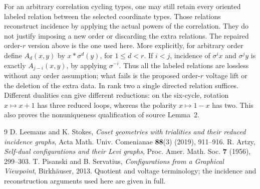 \documentclass[11pt,a4paper]{article}
\begin{document}
For an arbitrary correlation cycling types, one may still retain every
oriented labeled relation between the selected coordinate types. Those
relations reconstruct incidence by applying the actual powers of the
correlation. They do not justify imposing a new order or discarding the
extra relations. The repaired order-$r$ version above is the one used here. More explicitly,
for arbitrary order define $A_d(x,y)$ by $x*\sigma^d(y)$, for
$1\leq d<r$. If $i<j$, incidence of $\sigma^i x$ and $\sigma^j y$
is exactly $A_{j-i}(x,y)$, by applying $\sigma^{-i}$. Thus all the
labeled relations are lossless without any order assumption; what fails is
the proposed order-$r$ voltage lift or the deletion of the extra data.
In rank two a single directed relation suffices. Different dualities can
give different reductions: on the six-cycle, rotation $x\mapsto x+1$
has three reduced loops, whereas the polarity $x\mapsto1-x$ has two.
This also proves the nonuniqueness qualification of source Lemma~2.

\begin{thebibliography}{9}
 D. Leemans and K. Stokes, \emph{Coset geometries with trialities
and their reduced incidence graphs}, Acta Math. Univ. Comenianae
\textbf{88}(3) (2019), 911--916.
 R. Artzy, \emph{Self-dual configurations and their Levi graphs},
Proc. Amer. Math. Soc. \textbf{7} (1956), 299--303.
 T. Pisanski and B. Servatius, \emph{Configurations from a Graphical
Viewpoint}, Birkh\"auser, 2013. Quotient and voltage terminology; the incidence
and reconstruction arguments used here are given in full.
\end{thebibliography}
\end{document}
